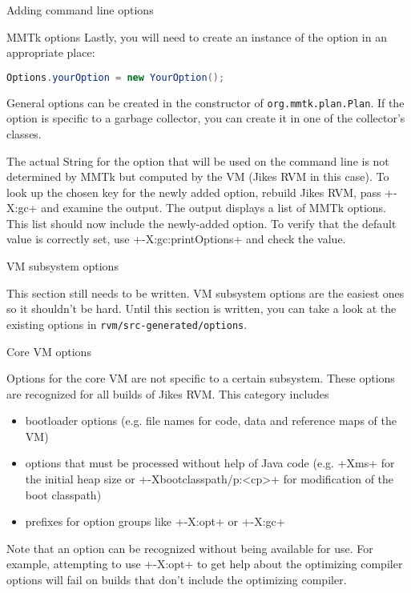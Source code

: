 \begin{section}{Adding command line options}
\begin{subsection}{MMTk options}
Lastly, you will need to create an instance of the option in an appropriate place:
\begin{lstlisting}[language=Java]
Options.yourOption = new YourOption();
\end{lstlisting}
General options can be created in the constructor of \texttt{org.mmtk.plan.Plan}. If the option is specific to a garbage collector, you can create it in one of the collector's classes.

The actual String for the option that will be used on the command line is not determined by MMTk but computed by the VM (Jikes RVM in this case). To look up the chosen key for the newly added option, rebuild Jikes RVM, pass \spverb+-X:gc+ and examine the output. The output displays a list of MMTk options. This list should now include the newly-added option. To verify that the default value is correctly set, use \spverb+-X:gc:printOptions+ and check the value.

\end{subsection}

\begin{subsection}{VM subsystem options}

This section still needs to be written. VM subsystem options are the easiest ones so it shouldn't be hard. Until this section is written, you can take a look at the existing options in \texttt{rvm/src-generated/options}.

\end{subsection}

\begin{subsection}{Core VM options}

Options for the core VM are not specific to a certain subsystem. These options are recognized for all builds of Jikes RVM. This category includes
\begin{itemize}
  \item bootloader options (e.g. file names for code, data and reference maps of the VM)
  \item options that must be processed without help of Java code (e.g. \spverb+Xms+ for the initial heap size or \spverb+-Xbootclasspath/p:<cp>+ for modification of the boot classpath)
  \item prefixes for option groups like \spverb+-X:opt+ or \spverb+-X:gc+
\end{itemize}

Note that an option can be recognized without being available for use. For example, attempting to use \spverb+-X:opt+ to get help about the optimizing compiler options will fail on builds that don't include the optimizing compiler.


\end{subsection}
\end{section}
